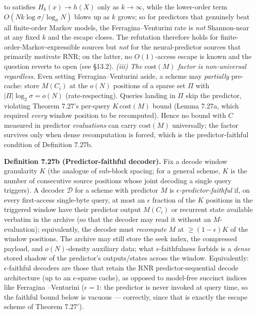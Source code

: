 \documentclass[
]{article}
\begin{document}
to satisfies $H_k(x) \to h(X)$ only as $k \to \infty$, while the
lower-order term $O(N k \log\sigma / \log_\sigma N)$ blows up as
$k$ grows; so for predictors that genuinely beat all finite-order Markov
models, the Ferragina--Venturini rate is \emph{not} Shannon-near at any
fixed $k$ and the escape closes. The refutation therefore holds for
finite-order-Markov-expressible sources but \emph{not} for the
neural-predictor sources that primarily motivate RNR; on the latter, no
$O(1)$-access escape is known and the question reverts to open (see
§13.2). \emph{(iii) The $\mathrm{cost}(M)$ factor is non-universal
regardless.} Even setting Ferragina--Venturini aside, a scheme may
\emph{partially} pre-cache: store $M(C_i)$ at the $o(N)$ positions of a
sparse set $\Pi$ with $|\Pi| \log_2\sigma = o(N)$ (rate-respecting).
Queries landing in $\Pi$ skip the predictor, violating Theorem 7.27's
per-query $K\,\mathrm{cost}(M)$ bound (Lemma 7.27a, which required
\emph{every} window position to be recomputed). Hence no bound with $C$
measured in predictor \emph{evaluations} can carry $\mathrm{cost}(M)$
universally; the factor survives only when dense recomputation is
forced, which is the predictor-faithful condition of Definition 7.27b.

\textbf{Definition 7.27b (Predictor-faithful decoder).} Fix a decode
window granularity $K$ (the analogue of sub-block spacing; for a general
scheme, $K$ is the number of consecutive source positions whose joint
decoding a single query triggers). A decoder $\mathcal{D}$ for a scheme
with predictor $M$ is \emph{$\epsilon$-predictor-faithful} if, on every
first-access single-byte query, at most an $\epsilon$ fraction of the
$K$ positions in the triggered window have their predictor output
$M(C_i)$ or recurrent state available verbatim in the archive (so that
the decoder may read it without an $M$-evaluation); equivalently, the
decoder must \emph{recompute} $M$ at $\geq (1-\epsilon) K$ of the
window positions. The archive may still store the seek index, the
compressed payload, and $o(N)$-density auxiliary data; what
$\epsilon$-faithfulness forbids is a \emph{dense} stored shadow of the
predictor's outputs/states across the window. Equivalently:
$\epsilon$-faithful decoders are those that retain the RNR
predictor-sequential decode architecture (up to an $\epsilon$-sparse
cache), as opposed to model-free succinct indices like Ferragina
--Venturini ($\epsilon = 1$: the predictor is never invoked at query
time, so the faithful bound below is vacuous --- correctly, since that
is exactly the escape scheme of Theorem 7.27$'$).
\end{document}
